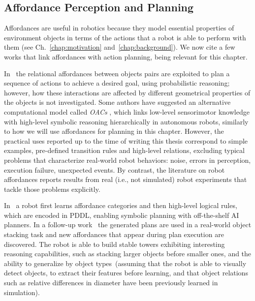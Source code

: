 \subsection{Affordance Perception and Planning}

Affordances are useful in robotics because they model essential properties of environment objects in terms of the actions that a robot is able to perform with them (see Ch.~\ref{chap:motivation} and~\ref{chap:background}).
We now cite a few works that link affordances with action planning, being relevant for this chapter.

In~\cite{moldovan:2018:ar} the relational affordances between objects pairs are exploited to plan a sequence of actions to achieve a desired goal, using probabilistic reasoning; however, how these interactions are affected by different geometrical properties of the objects is not investigated.
Some authors have suggested an alternative computational model called \emph{\acfp{OAC}} \cite{kruger:2011:ras}, which links low-level sensorimotor knowledge with high-level symbolic reasoning hierarchically in autonomous robots, similarly to how we will use affordances for planning in this chapter.
However, the practical uses reported up to the time of writing this thesis correspond to simple examples, pre-defined transition rules and high-level relations, excluding typical problems that characterize real-world robot behaviors: noise, errors in perception, execution failure, unexpected events.
By contrast, the literature on robot affordances reports results from real (i.e., not simulated) robot experiments that tackle those problems explicitly.

In~\cite{ugur:2015:icra} a robot first learns affordance categories and then high-level logical rules, which are encoded in \ac{PDDL}, enabling symbolic planning with off-the-shelf \ac{AI} planners.
In a follow-up work~\cite{ugur:2015:humanoids} the generated plans are used in a real-world object stacking task and new affordances that appear during plan execution are discovered.
The robot is able to build stable towers exhibiting interesting reasoning capabilities, such as stacking larger objects before smaller ones, and the ability to generalize by object types~(assuming that the robot is able to visually detect objects, to extract their features before learning, and that object relations such as relative differences in diameter have been previously learned in simulation).

